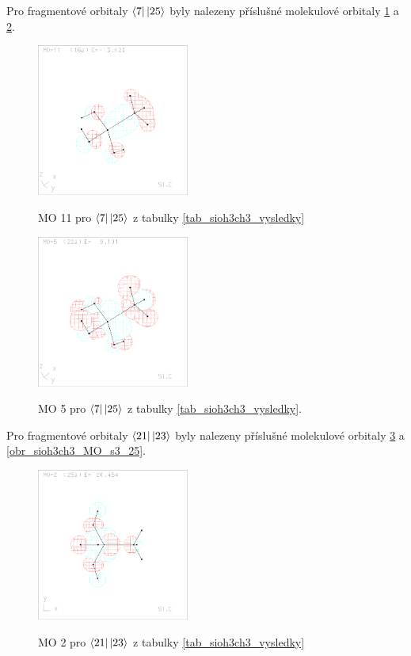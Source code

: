 \documentclass[
  digital, %
  table,   %
  lof,     %
  lot,     %
]{fithesis3}
\begin{document}
Pro fragmentové orbitaly $\bra{7}\ket{25}$ byly nalezeny příslušné molekulové orbitaly \ref{obr_sioh3ch3_MO_s2_11} a \ref{obr_sioh3ch3_MO_s2_5}.
  
  \begin{figure}[h]
\caption{MO 11 pro $\bra{7}\ket{25}$ z tabulky \ref{tab_sioh3ch3_vysledky}}
  \center
  \includegraphics[width=5cm]{sioh3ch3_obrazky/s2_11.eps}
  \label{obr_sioh3ch3_MO_s2_11}
  \end{figure}

\begin{figure}[h]
\caption{MO 5 pro $\bra{7}\ket{25}$ z tabulky \ref{tab_sioh3ch3_vysledky}.  }
  \center
  \includegraphics[width=5cm]{sioh3ch3_obrazky/s2_5.eps}
  \label{obr_sioh3ch3_MO_s2_5}
  \end{figure}

 \clearpage
 
  Pro fragmentové orbitaly $\bra{21}\ket{23}$ byly nalezeny příslušné molekulové orbitaly \ref{obr_sioh3ch3_MO_s3_2} a \ref{obr_sioh3ch3_MO_s3_25}.
  
  \begin{figure}[h]
\caption{MO 2 pro $\bra{21}\ket{23}$ z tabulky \ref{tab_sioh3ch3_vysledky}}
  \center
  \includegraphics[width=5cm]{sioh3ch3_obrazky/s3_2.eps}
  \label{obr_sioh3ch3_MO_s3_2}
  \end{figure}
\end{document}
